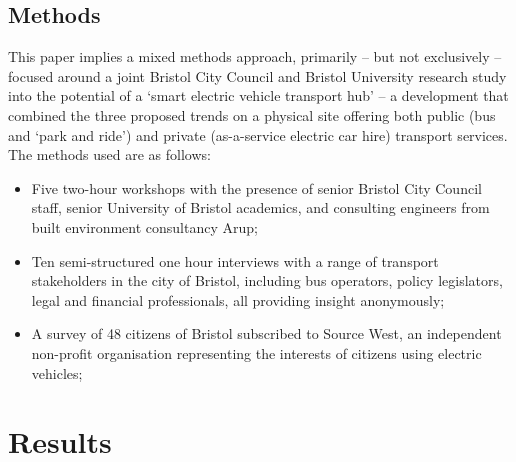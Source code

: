 \documentclass[journal]{IEEEtran}
\begin{document}
\subsection{Methods}

This paper implies a mixed methods approach, primarily – but not
exclusively -- focused around a joint Bristol City Council and Bristol
University research study into the potential of a `smart electric
vehicle transport hub' -- a development that combined the three
proposed trends on a physical site offering both public (bus and `park
and ride') and private (as-a-service electric car hire) transport
services. The methods used are as follows:

\begin{itemize}
\item Five two-hour workshops with the presence of senior Bristol City
Council staff, senior University of Bristol academics, and consulting
engineers from built environment consultancy Arup;
\item Ten semi-structured one hour interviews with a range of
transport stakeholders in the city of Bristol, including bus
operators, policy legislators, legal and financial professionals, all
providing insight anonymously;
\item A survey of 48 citizens of Bristol subscribed to Source West, an
independent non-profit organisation representing the interests of
citizens using electric vehicles;
\end{itemize}


\section{Results}


\end{document}
